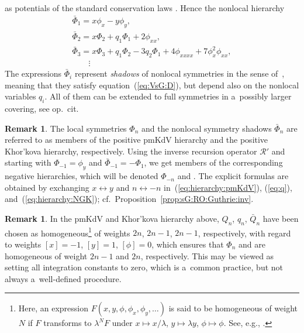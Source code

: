 \documentclass[pdftex]{sigma}
\def\eqref#1{{\rm(\ref{#1})}}
\def\RO{{\mathcal R}}
\numberwithin{equation}{section}
\theoremstyle{definition}
\newtheorem{Remark}[Theorem]{Remark}
\begin{document}
\begin{itemize}
\noindent
as potentials of the standard conservation laws
\cite[equation~(1.5)]{D-B-1977}.
Hence the nonlocal hierarchy{\samepage
\begin{gather}
\bar\Phi_1 = x \phi_x - y \phi_y,
\nonumber\\
\bar\Phi_2
 = x \Phi_2 + q_1 \Phi_1 + 2 \phi_{xx},
\nonumber\\
\bar\Phi_3 =
 x \Phi_3
 + q_1 \Phi_2
 - 3 q_2 \Phi_1
 + 4 \phi_{xxxx}
 + 7 \phi_x^2 \phi_{xx},
\label{eq:hierarchy:NGK}
\\
\qquad\vdots
\nonumber
\end{gather}}%
The expressions $\bar\Phi_i$ represent {\it shadows} of nonlocal
symmetries in the sense of~\cite{B-V-V,ISK-AMV-1989,JK-AV-RV-2017},
meaning that they satisfy equation~\eqref{eq:VsG:D},
but depend also on the nonlocal variables $q_i$.
All of them can be extended to full symmetries in a~possibly larger
covering, see op.\ cit.
\end{itemize}


\begin{Remark} \label{rem:negative}
The local symmetries $\Phi_n$ and the nonlocal symmetry shadows
$\bar\Phi_n$ are referred to as members of the positive pmKdV hierarchy
and the positive Khor'kova hierarchy, respectively.
Using the inverse recursion operator $\RO'$ and starting with
$\Phi_{-1} = \phi_y$ and $\bar\Phi_{-1} = -\Phi_1$,
we get members of the corresponding negative hierarchies,
which will be denoted $\Phi_{-n}$ and .
The explicit formulas are obtained by exchanging
$x \leftrightarrow y$ and $n \leftrightarrow -n$ in~\eqref{eq:hierarchy:pmKdV},
\eqref{eq:q}, and~\eqref{eq:hierarchy:NGK};
cf.\ Proposition~\ref{prop:sG:RO:Guthrie:inv}.
\end{Remark}

\begin{Remark} \label{rem:bt:i}
In the pmKdV and Khor'kova hierarchy above,
$Q_n$, $q_n$, $\bar Q_n$ have been chosen as homogeneous\footnote{Here, an expression $F(x,y,\phi,\phi_x,\phi_y,\dots)$ is said
to be homogeneous of weight $N$ if $F$ transforms to $\lambda^N F$
under $x \mapsto x/\lambda$,
$y\mapsto \lambda y$,
$\phi \mapsto \phi$.
See, e.g., \cite[Section~3.2]{JK-AV-RV-2017}.\label{fn:homo}}
of weights $2 n$, $2 n - 1$, $2 n - 1$, respectively, with regard to
weights $[x] = -1$, $[y] = 1$, $[\phi] = 0$,
which ensures that $\Phi_n$ and  are homogeneous of
weight $2 n - 1$ and $2 n$, respectively.
This may be viewed as setting all integration constants to zero,
which is a~common practice, but not always a~well-defined procedure.
\end{Remark}
\end{document}
